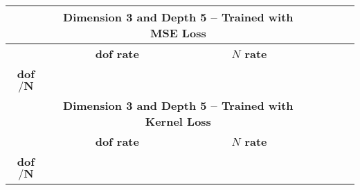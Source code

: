 \documentclass{article}
\newcommand{\Is}{N}
\begin{document}
    \begin{tabular}{|c|cccc|cccc|cccc|}
        \hline
        & \multicolumn{8}{c|}{\bf Dimension 3 and Depth 5 -- Trained with MSE Loss} \\ \hline
        & \multicolumn{4}{c|}{\bf dof rate} 
        & \multicolumn{4}{c|}{\bf $N$ rate} \\ \hline
        {\bf dof$/\boldsymbol{\Is}$} %
         \\
        \hline
        \hline
        & \multicolumn{8}{c|}{\bf Dimension 3 and Depth 5 -- Trained with Kernel Loss} \\ \hline
        & \multicolumn{4}{c|}{\bf dof rate} 
        & \multicolumn{4}{c|}{\bf $N$ rate} \\ \hline
        {\bf dof$/\boldsymbol{\Is}$} %
         \\
        \hline
    \end{tabular}
\end{document}
